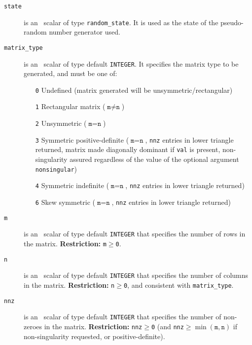 \vspace*{-3mm}
\begin{description}

\item[\texttt{state}] is an \intentinout\ scalar of type {\tt random\_state}.
It is used as the state of the pseudo-random number generator used.

\item[\texttt{matrix\_type}] is an \intentin\ scalar of type default
   {\tt INTEGER}. It specifies the matrix type to be generated, and must be one
   of:
   \begin{itemize}
      \item[\tt 0] Undefined (matrix generated will be unsymmetric/rectangular)
      \item[\tt 1] Rectangular matrix ($\texttt{m}\ne\texttt{n}$)
      \item[\tt 2] Unsymmetric ($\texttt{m}=\texttt{n}$)
      \item[\tt 3] Symmetric positive-definite ($\texttt{m}=\texttt{n}$,
         \texttt{nnz} entries in lower triangle returned, matrix made
         diagonally dominant if \texttt{val} is present, non-singularity
         assured regardless of the value of the optional argument
         {\tt nonsingular})
      \item[\tt 4] Symmetric indefinite ($\texttt{m}=\texttt{n}$,
         \texttt{nnz} entries in lower triangle returned)
      \item[\tt 6] Skew symmetric ($\texttt{m}=\texttt{n}$,
         \texttt{nnz} entries in lower triangle returned)
   \end{itemize}

\item[\texttt{m}] is an \intentin\ scalar of type default {\tt INTEGER} that
   specifies the number of rows in the matrix.
{\bf Restriction:} {\tt m$\geq$0}.

\item[\texttt{n}] is an \intentin\ scalar of type default {\tt INTEGER} that
   specifies the number of columns in the matrix.
{\bf Restriction:} {\tt n$\geq$0}, and consistent with \texttt{matrix\_type}.

\item[\texttt{nnz}] is an \intentin\ scalar of type default {\tt INTEGER} that
   specifies the number of non-zeroes in the matrix.
{\bf Restriction:} {\tt nnz$\geq$0} (and \texttt{nnz}$\geq\min(\texttt{m},\texttt{n})$ if non-singularity requested, or positive-definite).


\end{description}

